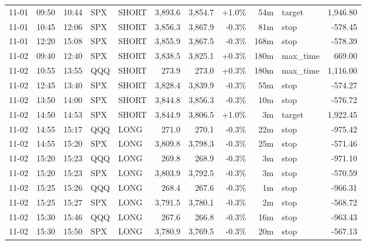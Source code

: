 \documentclass[11pt,a4paper,twoside]{article}
\begin{document}
\begin{center}
\begin{longtable}{>{\color{txtmain}}l l l l l r r r r >{\color{txtmain}}l r}
11-01 & 09:50 & 10:44 & SPX & SHORT & 3,893.6 & 3,854.7 & \textcolor{wingreen}{+1.0\%} & 54m & target & \textcolor{wingreen}{1,946.80} \\
11-01 & 10:45 & 12:06 & SPX & SHORT & 3,856.3 & 3,867.9 & \textcolor{lossred}{-0.3\%} & 81m & stop & \textcolor{lossred}{-578.45} \\
11-01 & 12:20 & 15:08 & SPX & SHORT & 3,855.9 & 3,867.5 & \textcolor{lossred}{-0.3\%} & 168m & stop & \textcolor{lossred}{-578.39} \\
11-02 & 09:40 & 12:40 & SPX & SHORT & 3,838.5 & 3,825.1 & \textcolor{wingreen}{+0.3\%} & 180m & max\_time & \textcolor{wingreen}{669.00} \\
11-02 & 10:55 & 13:55 & QQQ & SHORT & 273.9 & 273.0 & \textcolor{wingreen}{+0.3\%} & 180m & max\_time & \textcolor{wingreen}{1,116.00} \\
11-02 & 12:45 & 13:40 & SPX & SHORT & 3,828.4 & 3,839.9 & \textcolor{lossred}{-0.3\%} & 55m & stop & \textcolor{lossred}{-574.27} \\
11-02 & 13:50 & 14:00 & SPX & SHORT & 3,844.8 & 3,856.3 & \textcolor{lossred}{-0.3\%} & 10m & stop & \textcolor{lossred}{-576.72} \\
11-02 & 14:50 & 14:53 & SPX & SHORT & 3,844.9 & 3,806.5 & \textcolor{wingreen}{+1.0\%} & 3m & target & \textcolor{wingreen}{1,922.45} \\
11-02 & 14:55 & 15:17 & QQQ & LONG & 271.0 & 270.1 & \textcolor{lossred}{-0.3\%} & 22m & stop & \textcolor{lossred}{-975.42} \\
11-02 & 14:55 & 15:20 & SPX & LONG & 3,809.8 & 3,798.3 & \textcolor{lossred}{-0.3\%} & 25m & stop & \textcolor{lossred}{-571.46} \\
11-02 & 15:20 & 15:23 & QQQ & LONG & 269.8 & 268.9 & \textcolor{lossred}{-0.3\%} & 3m & stop & \textcolor{lossred}{-971.10} \\
11-02 & 15:20 & 15:23 & SPX & LONG & 3,803.9 & 3,792.5 & \textcolor{lossred}{-0.3\%} & 3m & stop & \textcolor{lossred}{-570.59} \\
11-02 & 15:25 & 15:26 & QQQ & LONG & 268.4 & 267.6 & \textcolor{lossred}{-0.3\%} & 1m & stop & \textcolor{lossred}{-966.31} \\
11-02 & 15:25 & 15:27 & SPX & LONG & 3,791.5 & 3,780.1 & \textcolor{lossred}{-0.3\%} & 2m & stop & \textcolor{lossred}{-568.72} \\
11-02 & 15:30 & 15:46 & QQQ & LONG & 267.6 & 266.8 & \textcolor{lossred}{-0.3\%} & 16m & stop & \textcolor{lossred}{-963.43} \\
11-02 & 15:30 & 15:50 & SPX & LONG & 3,780.9 & 3,769.5 & \textcolor{lossred}{-0.3\%} & 20m & stop & \textcolor{lossred}{-567.13} \\

\end{longtable}
\end{center}
\end{document}
